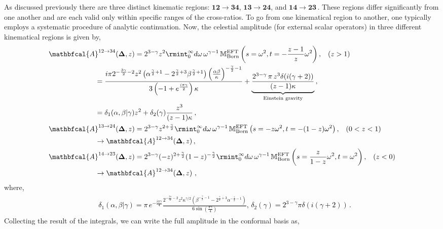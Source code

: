 As discussed previously there are three distinct kinematic regions: $\mathbf{12 \to 34}$, $\mathbf{13 \to 24}$, and $\mathbf{14 \to 23}\,.$ These regions differ significantly from one another and are each valid only within specific ranges of the cross-ratios. To go from one kinematical region to another, one typically employs a systematic procedure of analytic continuation.
Now, the celestial amplitude (for external scalar operators) in three different kinematical regions is given by,
\begin{align}
\begin{split}\label{3.10e}
&{\mathbfcal{A}}^{12\to 34}(\mathbf \Delta,z)=2^{3-\gamma}z^2\rmint_0^\infty d\omega\,\omega^{\gamma-1}\,\mathbb{M}_{\textrm{Born}}^{\textrm{EFT}}\left(s=\omega^2,t=-\frac{z-1}{z}\omega^2\right),\,\,\,\,\,(z>1)\\ &\hspace{2.3 cm}
   =\frac{i \pi  2^{-\frac{3 \gamma }{2}-2} z^2 \left(\alpha ^{\frac{\gamma }{2}+1}-2^{\frac{\gamma }{2}+3} \beta ^{\frac{\gamma }{2}+1}\right) \left(\frac{\alpha  \beta }{\kappa }\right)^{-\frac{\gamma }{2}-1}}{3 \left(-1+e^{\frac{i \pi  \gamma }{2}}\right) \kappa }+\underbrace{\frac{2^{3-\gamma}\, \pi\,  z^3 \delta (i (\gamma +2))}{(z-1)\kappa}}_{\text{Einstein gravity}}\,,\\ &
\hspace{2.3 cm}=\delta_1(\alpha,\beta|\gamma)z^2+\delta_2(\gamma)\frac{z^3}{(z-1)\kappa}\,,\\ &
{\mathbfcal{A}}^{13\to 24}(\mathbf \Delta,z)=2^{3-\gamma}z^{2+\frac{\gamma}{2}}\rmint_0^\infty d\omega\,\omega^{\gamma-1}\,\mathbb{M}_{\textrm{Born}}^{\textrm{EFT}}\left(s=-z\omega^2,t=-(1-z)\omega^2\right),\,\,\,\,\,(0<z<1)\\ & \hspace{2.3 cm}\to {\mathbfcal{A}}^{12\to 34}(\mathbf \Delta,z)\,,
   \\ &
{\mathbfcal{A}}^{14\to 23}(\mathbf \Delta,z)=2^{3-\gamma}(-z)^{2+\frac{\gamma}{2}}(1-z)^{-\frac{\gamma}{2}}\rmint_0^\infty d\omega\,\omega^{\gamma-1}\,\mathbb{M}_{\textrm{Born}}^{\textrm{EFT}}\left(s=\frac{z}{1-z}\omega^2,t=\omega^2\right),\,\,\,\,\,(z<0)
   \\ & \hspace{2.3 cm}\to{\mathbfcal{A}}^{12\to 34}(\mathbf \Delta,z)\,\,,
   \end{split}
   \end{align}
where,
\textcolor{black}{
\begin{align}
    \begin{split}
        &\delta_1(\alpha,\beta|\gamma)=\pi \,e^{-\frac{i\pi\gamma}{4}}\frac{  2^{-\frac{3 \gamma }{2}-2} z^2 \kappa^{\gamma/2} \left(\beta ^{-\frac{\gamma }{2}-1}-2^{\frac{\gamma }{2}+3} \alpha ^{-\frac{\gamma }{2}-1}\right) }{6  \sin\left(\frac{\pi \gamma}{4}\right) }, \,\delta_2(\gamma)={2^{3-\gamma}\pi \delta(i(\gamma+2))\,.}
    \end{split}
\end{align}}
\noindent
Collecting the result of the integrals, we can write the full amplitude in the conformal basis as, 

